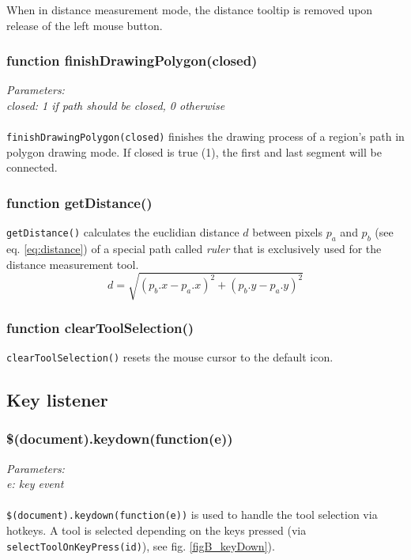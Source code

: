 When in distance measurement mode, the distance tooltip is removed upon release of the left mouse button.


\subsubsection{function finishDrawingPolygon(closed)}
\emph{Parameters:\\
	closed: 1 if path should be closed, 0 otherwise\\ \\
}
\texttt{finishDrawingPolygon(closed)} finishes the drawing process of a region's path in polygon drawing mode. If closed is true (1), the first and last segment will be connected.


\subsubsection{function getDistance()}
\texttt{getDistance()} calculates the euclidian distance $d$ between pixels $p_a$ and $p_b$ (see eq. \ref{eq:distance}\cite{Strang03}) of a special path called \emph{ruler} that is exclusively used for the distance measurement tool.
\begin{equation}\label{eq:distance}
	d = \sqrt{
	 	(p_b.x - p_a.x)^2 + (p_b.y - p_a.y)^2
	}
\end{equation}


\subsubsection{function clearToolSelection()}
\texttt{clearToolSelection()} resets the mouse cursor to the default icon.


\subsection{Key listener}

\subsubsection{\$(document).keydown(function(e))}
\emph{Parameters:\\
	e: key event\\ \\
}
\texttt{\$(document).keydown(function(e))} is used to handle the tool selection via hotkeys. A tool is selected depending on the keys pressed (via \texttt{selectToolOnKeyPress(id)}), see fig. \ref{figB_keyDown}).

